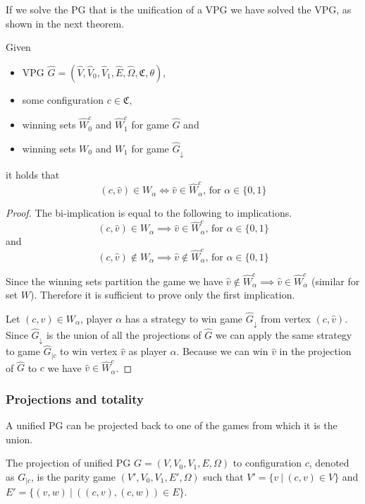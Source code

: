 If we solve the PG that is the unification of a VPG we have solved the VPG, as shown in the next theorem.
\begin{theorem}
	\label{theA_solve_UVPG_is_solve_VPG}
	Given 
	\begin{itemize}
		\item VPG $\hat{G} =  (\hat{V},\hat{V}_0,\hat{V}_1, \hat{E},\hat{\Omega}, \mathfrak{C},\theta)$,
		\item some configuration $c \in \mathfrak{C}$,
		\item winning sets $\hat{W}^c_0$ and $\hat{W}^c_1$ for game $\hat{G}$ and
		\item winning sets $W_0$ and $W_1$ for game $\hat{G}_{\downarrow}$
	\end{itemize}
	it holds that
	\[(c,\hat{v}) \in W_\alpha \iff \hat{v} \in \hat{W}^c_\alpha  \text{, for }\alpha \in \{0,1\}  \]
	\begin{proof}
		The bi-implication is equal to  the following to implications.
		\[ (c,\hat{v}) \in W_\alpha \implies \hat{v} \in \hat{W}^c_\alpha  \text{, for }\alpha \in \{0,1\} \]
		and
		\[ (c,\hat{v}) \notin W_\alpha\implies \hat{v} \notin \hat{W}^c_\alpha \text{, for }\alpha \in \{0,1\}  \]
		
		Since the winning sets partition the game we have $\hat{v} \notin \hat{W}^c_\alpha \implies \hat{v} \in \hat{W}^c_{\overline{\alpha}}$ (similar for set $W$). Therefore it is sufficient to prove only the first implication.
		
		Let $(c,\hat{v}) \in W_\alpha$, player $\alpha$ has a strategy to win game $\hat{G}_{\downarrow}$ from vertex $(c,\hat{v})$. Since $\hat{G}_{\downarrow}$ is the union of all the projections of $\hat{G}$ we can apply the same strategy to game $\hat{G}_{|c}$ to win vertex $\hat{v}$ as player $\alpha$. Because we can win $\hat{v}$ in the projection of $\hat{G}$ to $c$ we have $\hat{v} \in \hat{W}^c_\alpha$.
	\end{proof}
\end{theorem}

\subsubsection{Projections and totality}
A unified PG can be projected back to one of the games from which it is the union.
\begin{definition}
	The projection of unified PG $G = (V,V_0, V_1,E,{\Omega})$ to configuration $c$, denoted as $G_{|c}$, is the parity game $(V',{V}_0,{V}_1,E',{\Omega})$ such that $V' = \{ {v}\ |\ (c,{v}) \in V \}$ and $E' = \{ ({v},{w})\ |\ ((c,{v}),(c,{w})) \in E \} $.
\end{definition}

